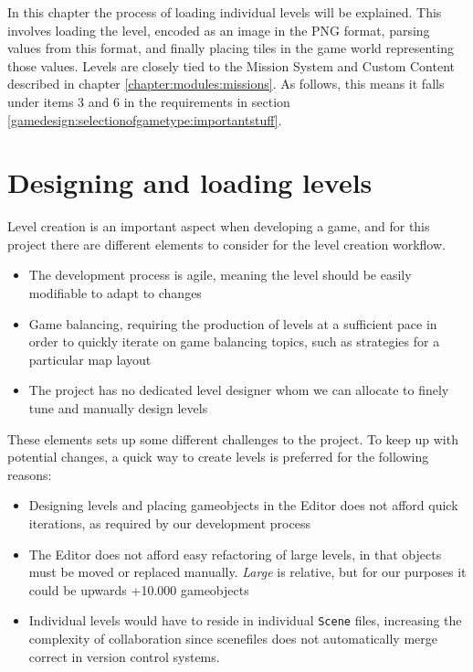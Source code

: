 In this chapter the process of loading individual levels will be explained.
This involves loading the level, encoded as an image in the PNG format, parsing values from this format, and finally placing tiles in the game world representing those values.
Levels are closely tied to the Mission System and Custom Content described in chapter \ref{chapter:modules:missions}.
As follows, this means it falls under items 3 and 6 in the requirements in section \ref{gamedesign:selectionofgametype:importantstuff}.

\section{Designing and loading levels}
Level creation is an important aspect when developing a game, and for this project there are different elements to consider for the level creation workflow.
\begin{itemize}
    \item The development process is agile, meaning the level should be easily modifiable to adapt to changes
    \item Game balancing, requiring the production of levels at a sufficient pace in order to quickly iterate on game balancing topics, such as strategies for a particular map layout
    \item The project has no dedicated level designer whom we can allocate to finely tune and manually design levels
\end{itemize}
These elements sets up some different challenges to the project.
To keep up with potential changes, a quick way to create levels is preferred for the following reasons:
\begin{itemize}
    \item Designing levels and placing gameobjects in the Editor does not afford quick iterations, as required by our development process
    \item The Editor does not afford easy refactoring of large levels, in that objects must be moved or replaced manually. \textit{Large} is relative, but for our purposes it could be upwards +10.000 gameobjects
    \item Individual levels would have to reside in individual \texttt{Scene} files, increasing the complexity of collaboration since scenefiles does not  automatically merge correct in version control systems.
\end{itemize}

